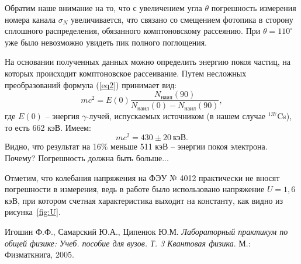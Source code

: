 \documentclass[a4paper, 12pt]{article}%
\begin{document}
	Обратим наше внимание на то, что с увеличением угла $\theta$ погрешность измерения номера канала $\sigma_N$ увеличивается, что связано со смещением фотопика в сторону сплошного распределения, обязанного комптоновскому рассеянию. При $\theta = 110^\circ$ уже было невозможно увидеть пик полного поглощения.
	
	На основании полученных данных можно определить энергию покоя частиц, на которых происходит комптоновское рассеивание. Путем несложных преобразований формула (\ref{eq2}) принимает вид:
	\begin{equation*}
		mc^2 = E(0) \frac{N_\text{наил}(90)}{N_\text{наил}(0)-N_\text{наил}(90)},
	\end{equation*}
	где $E(0)$ -- энергия $\gamma$-лучей, испускаемых источником (в нашем случае $^{137}$Cs), то есть 662 кэВ. Имеем:
	\[
	\boxed{mc^2 = 430 \pm 20 \ \text{кэВ}}.
	\]
	Видно, что результат на 16\% меньше 511 кэВ -- энергии покоя электрона. Почему? Погрешность должна быть больше...
	
	Отметим, что колебания напряжения на ФЭУ № 4012 практически не вносят погрешности в измерения, ведь в работе было использовано напряжение $U = 1,6$ кэВ, при котором счетная характеристика выходит на константу, как видно из рисунка~\ref{fig:U}.
	
\begin{thebibliography}{9}
Игошин Ф.Ф., Самарский Ю.А., Ципенюк Ю.М. 
\textit{Лабораторный практикум по общей физике: Учеб. пособие для вузов. Т. 3 Квантовая физика}. 
М.: Физматкнига, 2005.
\end{thebibliography}
\end{document}

